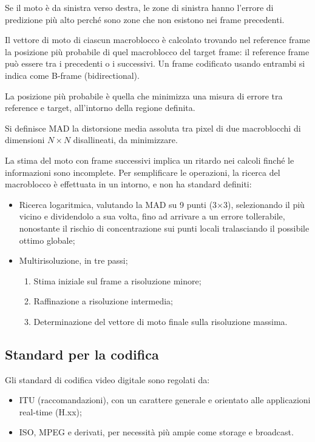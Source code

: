 Se il moto è da sinistra verso destra, le zone di sinistra hanno l'errore di predizione più alto perché sono zone che non esistono nei frame precedenti.

Il vettore di moto di ciascun macroblocco è calcolato trovando nel reference frame la posizione più probabile di quel macroblocco del target frame: il reference frame può essere tra i precedenti o i successivi. Un frame codificato usando entrambi si indica come B-frame (bidirectional).

La posizione più probabile è quella che minimizza una misura di errore tra reference e target, all'intorno della regione definita.

Si definisce MAD la distorsione media assoluta tra pixel di due macroblocchi di dimensioni $N \times N$ disallineati, da minimizzare.

La stima del moto con frame successivi implica un ritardo nei calcoli finché le informazioni sono incomplete. Per semplificare le operazioni, la ricerca del macroblocco è effettuata in un intorno, e non ha standard definiti:
\begin{itemize}
	\item Ricerca logaritmica, valutando la MAD su 9 punti (3$\times$3), selezionando il più vicino e dividendolo a sua volta, fino ad arrivare a un errore tollerabile, nonostante il rischio di concentrazione sui punti locali tralasciando il possibile ottimo globale;
	\item Multirisoluzione, in tre passi;
	\begin{enumerate}
		\item Stima iniziale sul frame a risoluzione minore;
		\item Raffinazione a risoluzione intermedia;
		\item Determinazione del vettore di moto finale sulla risoluzione massima.
	\end{enumerate}
\end{itemize}

\subsection{Standard per la codifica}
Gli standard di codifica video digitale sono regolati da:
\begin{itemize}
	\item ITU (raccomandazioni), con un carattere generale e orientato alle applicazioni real-time (H.xx);
	\item ISO, MPEG e derivati, per necessità più ampie come storage e broadcast.
\end{itemize}


